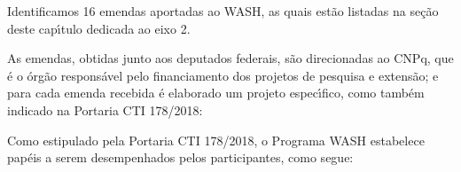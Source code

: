 \documentclass[
12pt,		%
openright,	%
twoside,  %
a4paper,			%
chapter=TITLE,		%
english,			%
french,				%
spanish,			%
brazil				%
]{USPSC-classe/USPSC}
\begin{document}
Identificamos 16 emendas aportadas ao WASH, as quais est\~ao listadas na se\c{c}\~ao deste cap\'{\i}tulo dedicada ao eixo 2.

















As emendas, obtidas junto aos deputados federais, s\~ao direcionadas ao CNPq, que \'e o \'org\~ao respons\'avel pelo financiamento dos projetos de pesquisa e extens\~ao; e para cada emenda recebida \'e elaborado um projeto espec\'{\i}fico, como tamb\'em indicado na Portaria CTI 178/2018:


















\noindent\begin{center}\mbox{\centering{}}\end{center}


Como estipulado pela Portaria CTI 178/2018, o Programa WASH estabelece pap\'eis a serem desempenhados pelos participantes, como segue:
\end{document}
